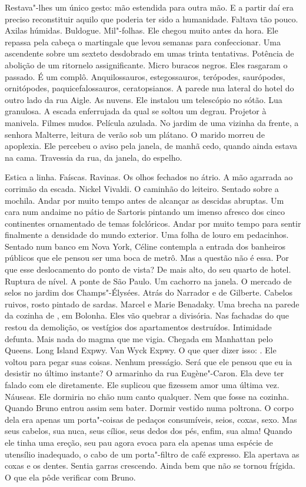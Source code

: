 Restava"-lhes um único gesto: mão estendida para outra mão. E a partir
daí era preciso reconstituir aquilo que poderia ter sido a humanidade.
Faltava tão pouco. Axilas húmidas. Buldogue. Mil"-folhas. Ele chegou
muito antes da hora. Ele repassa pela cabeça o martingale que levou
semanas para confeccionar. Uma ascendente sobre um sexteto desdobrado em
umas trinta tentativas. Potência de abolição de um ritornelo
assignificante. Micro buracos negros. Eles rasgaram o passado. É um
complô. Anquilossauros, estegossauros, terópodes, saurópodes,
ornitópodes, paquicefalossauros, ceratopsianos. A parede nua lateral do
hotel do outro lado da rua Aigle. As nuvens. Ele instalou um telescópio
no sótão. Lua granulosa. A escada enferrujada da qual se soltou um
degrau. Projetor à manivela. Filmes mudos. Película azulada. No jardim
de uma vizinha da frente, a senhora Malterre, leitura de verão sob um
plátano. O marido morreu de apoplexia. Ele percebeu o aviso pela janela,
de manhã cedo, quando ainda estava na cama. Travessia da rua, da janela,
do espelho.

Estica a linha. Faíscas. Ravinas. Os olhos fechados no átrio. A mão
agarrada ao corrimão da escada. Nickel Vivaldi. O caminhão do leiteiro.
Sentado sobre a mochila. Andar por muito tempo antes de alcançar as
descidas abruptas. Um cara num andaime no pátio de Sartoris pintando um
imenso afresco dos cinco continentes ornamentado de temas folclóricos.
Andar por muito tempo para sentir finalmente a densidade do mundo
exterior. Uma folha de louro em pedacinhos. Sentado num banco em Nova
York, Céline contempla a entrada dos banheiros públicos que ele pensou
ser uma boca de metrô. Mas a questão não é essa. Por que esse
deslocamento do ponto de vista? De mais alto, do seu quarto de hotel.
Ruptura de nível. A ponte de São Paulo. Um cachorro na janela. O mercado
de selos no jardim dos Champs"-Élysées. Atrás do Narrador e de Gilberte.
Cabelos ruivos, rosto pintado de sardas. Marcel e Marie Benadaky. Uma
brecha na parede da cozinha de , em Bolonha. Eles vão quebrar a
divisória. Nas fachadas do que restou da demolição, os vestígios dos
apartamentos destruídos. Intimidade defunta. Mais nada do magma que me
vigia. Chegada em Manhattan pelo Queens. Long Island Expwy. Van Wyck
Expwy. O que quer dizer isso: . Ele voltou para pegar suas coisas.
Nenhum presságio. Será que ele pensou que eu ia desistir no último
instante? O armarinho da rua Eugène"-Caron. Ela deve ter falado com ele
diretamente. Ele suplicou que fizessem amor uma última vez. Náuseas. Ele
dormiria no chão num canto qualquer. Nem que fosse na cozinha. Quando
Bruno entrou assim sem bater. Dormir vestido numa poltrona. O corpo dela
era apenas um porta"-coisas de pedaços consumíveis, seios, coxas, sexo.
Mas seus cabelos, sua nuca, seus cílios, seus dedos dos pés, enfim, sua
alma! Quando ele tinha uma ereção, seu pau agora evoca para ela apenas
uma espécie de utensílio inadequado, o cabo de um porta"-filtro de café
expresso. Ela apertava as coxas e os dentes. Sentia garras crescendo.
Ainda bem que não se tornou frígida. O que ela pôde verificar com Bruno.

